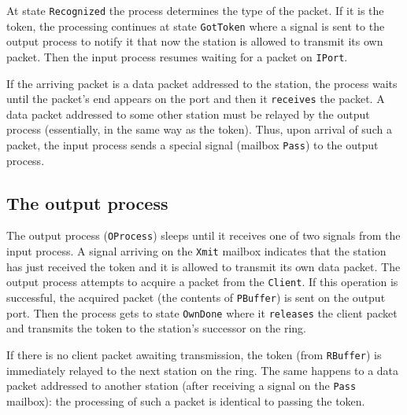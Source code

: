 At state {\tt Recognized} the process determines the type of the
packet.
If it is the token, the processing continues at state {\tt GotToken} where
a signal is sent to the output process to notify it that now the station
is allowed to transmit its own packet.
Then the input process resumes waiting for a packet on {\tt IPort}.

If the arriving packet is a data packet addressed to the
station, the process waits until the packet's end appears on the port and then
it {\tt receives} the packet.
A data packet addressed to some other station must be relayed by the
output process (essentially, in the same way as the token).
Thus, upon arrival of such a packet, the input process sends a special
signal (mailbox {\tt Pass}) to the output process.

\subsection{The output process}

The output process ({\tt OProcess}) sleeps until it receives
one of two signals from the input process.
A signal arriving on the {\tt Xmit} mailbox
indicates that the station has just
received the token and it is allowed to transmit its own data packet.
The output process attempts to acquire a packet from the {\tt Client}.
If this operation is successful,
the acquired packet (the contents of {\tt PBuffer}) is sent on the output port.
Then the process gets to state {\tt OwnDone} where it
{\tt releases} the client packet and
transmits the token to the station's successor on the ring.

If there is no client packet awaiting transmission, the token (from
{\tt RBuffer}) is immediately relayed to the next station on the ring.
The same happens to a data packet addressed to another station (after
receiving a signal on the {\tt Pass} mailbox): the processing of such a packet
is identical to passing the token.



